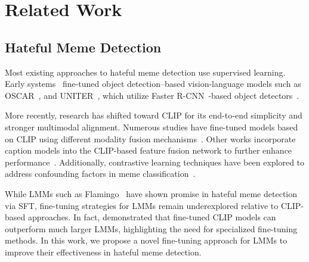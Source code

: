 \section{Related Work}
\subsection{Hateful Meme Detection}
Most existing approaches to hateful meme detection use supervised learning. Early systems~\cite{RonHMC1st2020, VilioHMC2nd2020} fine-tuned object detection–based vision-language models such as OSCAR~\cite{li2020oscar}, and UNITER~\cite{Uniter2019}, which utilize Faster R-CNN~\cite{fater_RCNN_2015}-based object detectors~\cite{Anderson2017up-down, vinVL2021}. 

More recently, research has shifted toward CLIP \cite{clip2021} for its end-to-end simplicity and stronger multimodal alignment. Numerous studies have fine-tuned models based on CLIP using different modality fusion mechanisms~\cite{PramanickMomenta2021, KumarHateClip2022, Shah2024memeclip_pridemm}. Other works incorporate caption models into the CLIP-based feature fusion network to further enhance performance~\cite{Burbi_2023_Issues, Cao_2023_ProCap, Ji2024CapAlign}. Additionally, contrastive learning techniques have been explored to address confounding factors in meme classification~\cite{LippeHMFramework2020, RGCL2024Mei}. %

While LMMs such as Flamingo~\cite{Flamingo22} have shown promise in hateful meme detection via SFT, fine-tuning strategies for LMMs remain underexplored relative to CLIP-based approaches. In fact, \citet{RGCL2024Mei} demonstrated that fine-tuned CLIP models can outperform much larger LMMs, highlighting the need for specialized fine-tuning methods. In this work, we propose a novel fine-tuning approach for LMMs to improve their effectiveness in hateful meme detection.  

